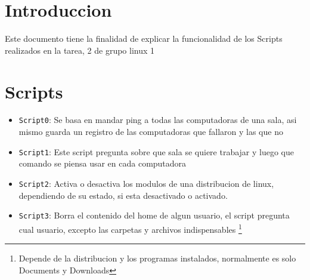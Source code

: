 \documentclass[12pt,spanish,pdftex]{article}
\begin{document}
\section{Introduccion}

Este documento tiene la finalidad de explicar la funcionalidad de los {\bt Scripts}
realizados en la tarea, 2 de grupo linux 1

\section{Scripts}

\begin{itemize}
\item{{\tt Script0}: Se basa en mandar ping a todas las computadoras de una sala,
asi mismo guarda un registro de las computadoras que fallaron y las que no}
\item{{\tt Script1}: Este script pregunta sobre que sala se quiere trabajar y luego
que comando se piensa usar en cada computadora}
\item{{\tt Script2}: Activa o desactiva los modulos de una distribucion de linux,
dependiendo de su estado, si esta desactivado o activado.}
\item{{\tt Script3}: Borra el contenido del home de algun usuario, el script pregunta cual
usuario, excepto las carpetas y archivos indispensables \footnote[0]{ Depende 
de la distribucion y los programas instalados, normalmente es solo Documents y Downloads }} 
\end{itemize}
\end{document}
